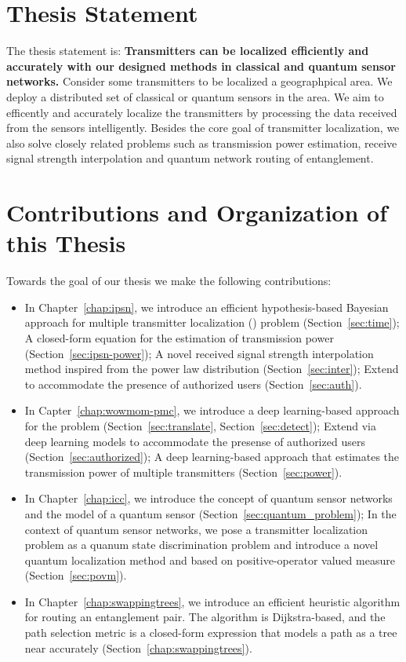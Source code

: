 \section{Thesis Statement}

The thesis statement is: \textbf{Transmitters can be localized efficiently and accurately with our designed methods in classical and quantum sensor networks.} 
Consider some transmitters to be localized a geographpical area. We deploy a distributed set of classical or quantum sensors in the area.
We aim to efficently and accurately localize the transmitters by processing the data received from the sensors intelligently.
Besides the core goal of transmitter localization, we also solve closely related problems such as transmission power estimation, 
receive signal strength interpolation and quantum network routing of entanglement.

\section{Contributions and Organization of this Thesis}

Towards the goal of our thesis we make the following contributions:

\begin{itemize}
    \item In Chapter~\ref{chap:ipsn}, we introduce an efficient hypothesis-based Bayesian approach \ouralgo for multiple transmitter localization (\mtl) problem (Section~\ref{sec:time}); 
          A closed-form equation for the estimation of transmission power (Section~\ref{sec:ipsn-power});
          A novel received signal strength interpolation method inspired from the power law distribution (Section~\ref{sec:inter});
          Extend \ouralgo to accommodate the presence of authorized users (Section~\ref{sec:auth}).
    \item In Capter~\ref{chap:wowmom-pmc}, we introduce a deep learning-based approach \our for the \mtl problem (Section~\ref{sec:translate}, Section~\ref{sec:detect});
          Extend \our via deep learning models to accommodate the presense of authorized users (Section~\ref{sec:authorized});
          A deep learning-based approach that estimates the transmission power of multiple transmitters (Section~\ref{sec:power}).
    \item In Chapter~\ref{chap:icc}, we introduce the concept of quantum sensor networks and the model of a quantum sensor (Section~\ref{sec:quantum_problem});
          In the context of quantum sensor networks, we pose a transmitter localization problem as a quanum state discrimination problem 
          and introduce a novel quantum localization method \povm and \povmpro based on positive-operator valued measure (Section~\ref{sec:povm}).
    \item In Chapter~\ref{chap:swappingtrees}, we introduce an efficient heuristic algorithm \dpalt for routing an entanglement pair.
          The algorithm is Dijkstra-based, and the path selection metric is a closed-form expression that models a path as a tree near accurately (Section~\ref{chap:swappingtrees}).
\end{itemize}


